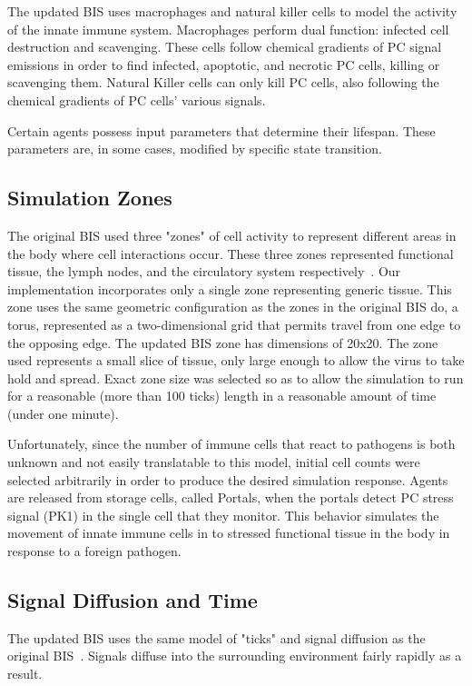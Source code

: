 \documentclass[10pt,conference]{IEEEtran}
\begin{document}
\indent
The updated BIS uses macrophages and natural killer cells to model the activity
of the innate immune system. Macrophages perform dual function: infected cell
destruction and scavenging. These cells follow chemical gradients of PC signal
emissions in order to find infected, apoptotic, and necrotic PC cells, killing
or scavenging them. Natural Killer cells can only kill PC cells, also following
the chemical gradients of PC cells' various signals.

\indent
Certain agents possess input parameters that determine their lifespan. These
parameters are, in some cases, modified by specific state transition.

\subsection{Simulation Zones}
The original BIS used three "zones" of cell activity to represent different
areas in the body where cell interactions occur. These three zones represented
functional tissue, the lymph nodes, and the circulatory system
respectively~\cite{Folcik:2007}. Our implementation incorporates only a single
zone representing generic tissue.  This zone uses the same geometric
configuration as the zones in the original BIS do, a torus, represented as a
two-dimensional grid that permits travel from one edge to the opposing edge.
The updated BIS zone has dimensions of 20x20. The zone used represents a small
slice of tissue, only large enough to allow the virus to take hold and spread.
Exact zone size was selected so as to allow the simulation to run for a
reasonable (more than 100 ticks) length in a reasonable amount of time (under
one minute).

\indent
Unfortunately, since the number of immune cells that react to pathogens is both
unknown and not easily translatable to this model, initial cell counts were
selected arbitrarily in order to produce the desired simulation response. Agents are
released from storage cells, called Portals, when the portals detect PC stress
signal (PK1) in the single cell that they monitor. This behavior simulates the
movement of innate immune cells in to stressed functional tissue in the body in
response to a foreign pathogen.

\subsection{Signal Diffusion and Time}
The updated BIS uses the same model of "ticks" and signal diffusion as the
original BIS~\cite{Folcik:2007}. Signals diffuse into the surrounding
environment fairly rapidly as a result.
\end{document}
